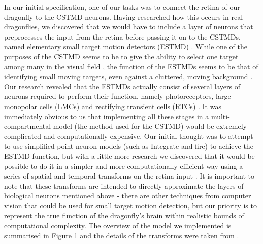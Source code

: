 \documentclass[a4paper,11pt]{article}
\begin{document}
In our initial specification, one of our tasks was to connect the retina of our dragonfly to the CSTMD neurons. Having researched how this occurs in real dragonflies, we discovered that we would have to include a layer of neurons that preprocesses the input from the retina before passing it on to the CSTMDs, named elementary small target motion detectors (ESTMD) \cite{Wiederman2008}. While one of the purposes of the CSTMD seems to be to give the ability to select one target among many in the visual field \cite{w13}, the function of the ESTMDs seems to be that of identifying small moving targets, even against a cluttered, moving background \cite{Wiederman2008}.
\newline
\newline
Our research revealed that the ESTMDs actually consist of several layers of neurons required to perform their function, namely photoreceptors, large monopolar cells (LMCs) and rectifying transient cells (RTCs) \cite{Wiederman2008}. It was immediately obvious to us that implementing all these stages in a multi-compartmental model (the method used for the CSTMD) would be extremely complicated and computationally expensive. Our initial thought was to attempt to use simplified point neuron models (such as Integrate-and-fire) to achieve the ESTMD function, but with a little more research we discovered that it would be possible to do it in a simpler and more computationally efficient way using a series of spatial and temporal transforms on the retina input \cite{Wiederman2008} \cite{hal11}. It is important to note that these transforms are intended to directly approximate the layers of biological neurons mentioned above - there are other techniques from computer vision that could be used for small target motion detection, but our priority is to represent the true function of the dragonfly's brain within realistic bounds of computational complexity. The overview of the model we implemented is summarised in Figure 1 and the details of the transforms were taken from \cite{hal11}. 
\end{document}
